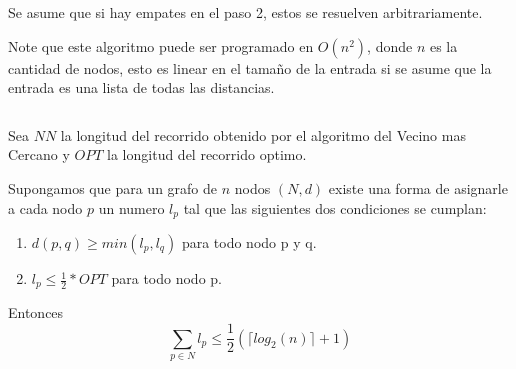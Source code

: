 \documentclass[spanish]{llncs}
\begin{document}
Se asume que si hay empates en el paso 2, estos se resuelven arbitrariamente.

Note que este algoritmo puede ser programado en $O(n^2)$, donde $n$ es la
cantidad de nodos, esto es linear en el tamaño de la entrada si se asume que la
entrada es una lista de todas las distancias.

\inputminted{python}{code.py}

Sea $NN$ la longitud del recorrido obtenido por el algoritmo del Vecino mas Cercano
y $OPT$ la longitud del recorrido optimo.

\begin{lemma}
	\label{lemma:1}
	Supongamos que para un grafo de $n$ nodos $(N,d)$ existe una forma de asignarle
	a cada nodo $p$ un numero $l_p$ tal que las siguientes dos condiciones se cumplan:
	\begin{enumerate}
		\item $d(p,q) \ge min(l_p,l_q)$ para todo nodo p y q.
		\item $l_p \le \frac{1}{2}*OPT$ para todo nodo p.
	\end{enumerate}
	Entonces 
	$$\sum_{p \in N} l_p \le \frac{1}{2}(\lceil log_2(n) \rceil + 1)$$
\end{lemma}
\end{document}
